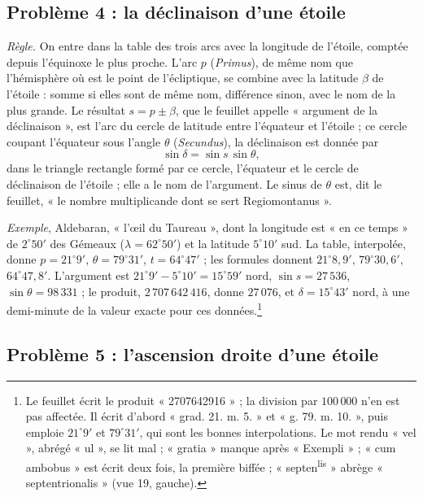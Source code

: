 \documentclass[11pt,a4paper]{article}
\begin{document}
\subsection*{Problème 4 : la déclinaison d'une étoile}

\emph{Règle.} On entre dans la table des trois arcs avec la longitude de l'étoile,
comptée depuis l'équinoxe le plus proche. L'arc $p$ (\emph{Primus}), de même nom
que l'hémisphère où est le point de l'écliptique, se combine avec la latitude
$\beta$ de l'étoile : somme si elles sont de même nom, différence sinon, avec le
nom de la plus grande. Le résultat $s = p \pm \beta$, que le feuillet appelle
« argument de la déclinaison », est l'arc du cercle de latitude entre l'équateur
et l'étoile ; ce cercle coupant l'équateur sous l'angle $\theta$
(\emph{Secundus}), la déclinaison est donnée par
\[
\sin\delta = \sin s\,\sin\theta ,
\]
dans le triangle rectangle formé par ce cercle, l'équateur et le cercle de
déclinaison de l'étoile ; elle a le nom de l'argument. Le sinus de $\theta$ est,
dit le feuillet, « le nombre multiplicande dont se sert Regiomontanus ».

\emph{Exemple}, Aldebaran, « l'œil du Taureau », dont la longitude est « en ce
temps » de $2^\circ 50'$ des Gémeaux ($\lambda = 62^\circ 50'$) et la latitude
$5^\circ 10'$ sud. La table, interpolée, donne $p = 21^\circ 9'$,
$\theta = 79^\circ 31'$, $t = 64^\circ 47'$ ; les formules donnent
$21^\circ 8{,}9'$, $79^\circ 30{,}6'$, $64^\circ 47{,}8'$. L'argument est
$21^\circ 9' - 5^\circ 10' = 15^\circ 59'$ nord, $\sin s = 27\,536$,
$\sin\theta = 98\,331$ ; le produit, $2\,707\,642\,416$, donne $27\,076$, et
$\delta = 15^\circ 43'$ nord, à une demi-minute de la valeur exacte pour ces
données.\footnote{Le feuillet écrit le produit « 2707642916 » ; la division par
$100\,000$ n'en est pas affectée. Il écrit d'abord « grad. 21. m. 5. » et
« g. 79. m. 10. », puis emploie $21^\circ 9'$ et $79^\circ 31'$, qui sont les
bonnes interpolations. Le mot rendu « vel », abrégé « ul », se lit mal ;
« gratia » manque après « Exempli » ; « cum ambobus » est écrit deux fois, la
première biffée ; « septen\textsuperscript{lis} » abrège « septentrionalis »
(vue 19, gauche).}

\subsection*{Problème 5 : l'ascension droite d'une étoile}
\end{document}
